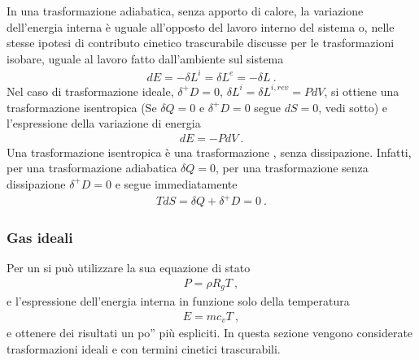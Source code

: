 \documentclass[letterpaper,10pt,italian]{jupyterBook}
\begin{document}
\sphinxAtStartPar
{} In una trasformazione adiabatica, senza apporto di calore, la variazione dell’energia interna è uguale all’opposto del lavoro interno del sistema o, nelle stesse ipotesi di contributo cinetico trascurabile discusse per le trasformazioni isobare, uguale al lavoro fatto dall’ambiente sul sistema
\begin{equation*}
\begin{split}d E = - \delta L^i = \delta L^{e} = - \delta L \ .\end{split}
\end{equation*}
\sphinxAtStartPar
Nel caso di trasformazione ideale, \(\delta^+ D = 0\), \(\delta L^i = \delta L^{i,rev} = P dV\), si ottiene una trasformazione isentropica (Se \(\delta Q = 0\) e \(\delta^+ D = 0\) segue \(dS = 0\), vedi sotto) e l’espressione della variazione di energia
\begin{equation*}
\begin{split}d E = - P dV \ .\end{split}
\end{equation*}
\sphinxAtStartPar
{} Una trasformazione isentropica è una trasformazione , senza dissipazione. Infatti, per una trasformazione adiabatica \(\delta Q = 0\), per una trasformazione senza dissipazione \(\delta^+ D = 0\) e segue immediatamente
\begin{equation*}
\begin{split}T d S = \delta Q + \delta^+ D = 0 \ .\end{split}
\end{equation*}

\subsubsection{Gas ideali}
\label{\detokenize{ch/thermodynamics/heat-engine-td-transformations:gas-ideali}}
\sphinxAtStartPar
Per un {\hyperref[\detokenize{ch/thermodynamics/ideal-gas:physics-hs-thermodynamics-matter-gases-ideal}]{}} si può utilizzare la sua equazione di stato
\begin{equation*}
\begin{split}P = \rho R_g T \ ,\end{split}
\end{equation*}
\sphinxAtStartPar
e l’espressione dell’energia interna in funzione solo della temperatura  
\begin{equation*}
\begin{split}E = m c_v T \ ,\end{split}
\end{equation*}
\sphinxAtStartPar
e ottenere dei risultati un po” più espliciti. In questa sezione vengono considerate trasformazioni ideali e con termini cinetici trascurabili.
\end{document}
